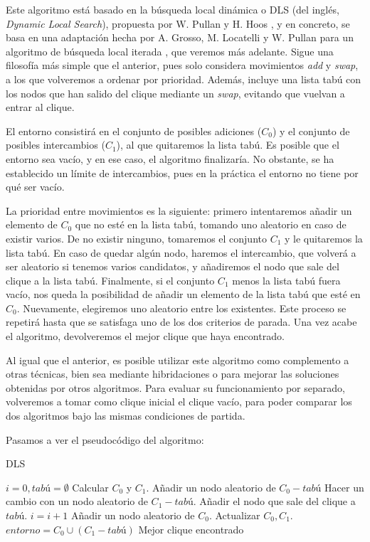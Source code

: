 Este algoritmo está basado en la búsqueda local dinámica o DLS (del inglés,
\textit{Dynamic Local Search}), propuesta por W. Pullan y H. Hoos \citep{pullan:2006},
y en concreto, se basa en una adaptación hecha por A. Grosso, M. Locatelli y W. Pullan
para un algoritmo de búsqueda local iterada \citep{grosso:2008}, que veremos más adelante.
Sigue una filosofía más simple que el anterior, pues solo considera movimientos \textit{add}
y \textit{swap}, a los que volveremos a ordenar por prioridad. Además, incluye una lista
tabú con los nodos que han salido del clique mediante un \textit{swap}, evitando que vuelvan
a entrar al clique.

El entorno consistirá en el conjunto de posibles adiciones ($C_0$) y el conjunto de
posibles intercambios ($C_1$), al que quitaremos la lista tabú. Es posible que el entorno
sea vacío, y en ese caso, el algoritmo finalizaría. No obstante, se ha establecido
un límite de intercambios, pues en la práctica el entorno no tiene por qué ser vacío.

La prioridad entre movimientos es la siguiente: primero intentaremos añadir un elemento de
$C_0$ que no esté en la lista tabú, tomando uno aleatorio en caso de existir varios.
De no existir ninguno, tomaremos el conjunto $C_1$ y le quitaremos la lista tabú.
En caso de quedar algún nodo, haremos el intercambio, que volverá a ser aleatorio
si tenemos varios candidatos, y añadiremos el nodo que sale del clique a la lista tabú.
Finalmente, si el conjunto $C_1$ menos la lista tabú fuera vacío, nos queda la
posibilidad de añadir un elemento de la lista tabú que esté en $C_0$. Nuevamente,
elegiremos uno aleatorio entre los existentes. Este proceso se repetirá hasta que se
satisfaga uno de los dos criterios de parada. Una vez acabe el algoritmo, devolveremos
el mejor clique que haya encontrado.

Al igual que el anterior, es posible utilizar este algoritmo como complemento a otras
técnicas, bien sea mediante hibridaciones o para mejorar las soluciones obtenidas
por otros algoritmos. Para evaluar su funcionamiento por separado, volveremos a tomar
como clique inicial el clique vacío, para poder comparar los dos algoritmos bajo las
mismas condiciones de partida.

Pasamos a ver el pseudocódigo del algoritmo:

\begin{algorithm}[H]
\caption{DLS}
  \begin{algorithmic}
    \State $i = 0, tabú = \emptyset$
    \State Calcular $C_0$ y $C_1$.
    \Repeat
        \State Añadir un nodo aleatorio de $C_0 - tabú$
        \State Hacer un cambio con un nodo aleatorio de $C_1 - tabú$.
        \State Añadir el nodo que sale del clique a $tabú$.
        \State $i = i + 1$
        \State Añadir un nodo aleatorio de $C_0$.
      \EndIf
      \State Actualizar $C_0, C_1$.
      \State $entorno = C_0 \cup (C_1 - tabú)$
    \Return Mejor clique encontrado
    \EndFunction
  \end{algorithmic}
\end{algorithm}

